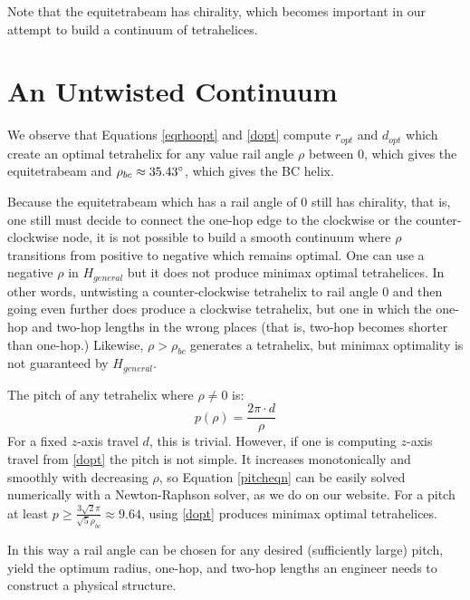 \documentclass[11pt]{article}
\begin{document}
Note that the equitetrabeam has chirality, which becomes important in our attempt to build a
continuum of tetrahelices.

\section{An Untwisted Continuum}


We observe that Equations \eqref{eqrhoopt} and \eqref{dopt} compute $r_{opt}$ and $d_{opt}$ which
create an optimal tetrahelix for any value rail angle $\rho$ between $0$, which
gives the equitetrabeam and
$\rho_{bc} \approx 35.43 \degree$, which gives the BC helix.

 Because the equitetrabeam which has a rail angle of $0$ still has
 chirality, that is, one still must decide to connect the one-hop edge to
 the clockwise or the counter-clockwise node, it is not possible to build
 a smooth continuum where $\rho$ transitions from positive to negative
 which remains optimal. One can use a negative $\rho$ in $H_{general}$
 but it does not produce minimax optimal tetrahelices. In other words,
 untwisting a counter-clockwise tetrahelix to rail angle $0$ and then going
even further does produce a clockwise tetrahelix, but one in which the
 one-hop and two-hop lengths in the wrong places (that is, two-hop
 becomes shorter than one-hop.) Likewise, $\rho > \rho_{bc}$ generates
 a tetrahelix, but minimax optimality is not guaranteed by $H_{general}$.
 
The pitch of any tetrahelix 
where $\rho \neq 0$ is:
\begin{equation}
  \label{pitcheqn}
p(\rho) = \frac{2 \pi  \cdot d}{\rho}
\end{equation}
For a fixed $z$-axis travel $d$, this is trivial.
However, if one is computing 
$z$-axis travel from \eqref{dopt} the pitch is not simple.
It increases monotonically and smoothly with decreasing $\rho$, so
Equation \eqref{pitcheqn} can be easily solved numerically with a Newton-Raphson
solver, as we do on our website.
For a pitch at least $ p \geq \frac{3  \sqrt{2}  \pi}{\sqrt{5}\rho_{bc}} \approx 9.64 $,
using \eqref{dopt} produces minimax optimal tetrahelices.

In this way a rail angle can be chosen for any desired (sufficiently large) pitch, yield
the optimum radius, one-hop, and two-hop lengths an engineer needs to
construct a physical structure.
\end{document}
